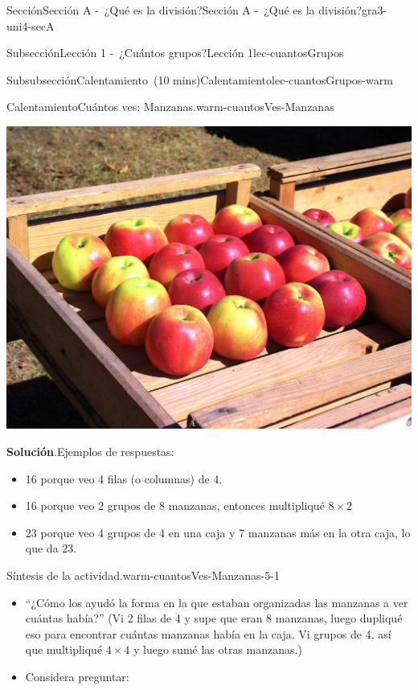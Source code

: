 \documentclass[oneside,10pt,]{article}
\newcommand{\blocktitlefont}{\relax}
\begin{document}
\begin{sectionptx}{Sección}{Sección A -~¿Qué es la división?}{}{Sección A -~¿Qué es la división?}{}{}{gra3-uni4-secA}
\begin{subsectionptx}{Subsección}{Lección 1 -~¿Cuántos grupos?}{}{Lección 1}{}{}{lec-cuantosGrupos}
\begin{subsubsectionptx}{Subsubsección}{Calentamiento~(10 mins)}{}{Calentamiento}{}{}{lec-cuantosGrupos-warm}
\begin{exploration}{Calentamiento}{Cuántos ves: Manzanas.}{warm-cuantosVes-Manzanas}
\begin{image}{0}{1}{0}{}
\includegraphics[width=\linewidth]{external/jpg-source/apples-1642732_1920.jpg}
\end{image}%
\par\smallskip%
\noindent\textbf{\blocktitlefont Solución}.\hypertarget{warm-cuantosVes-Manzanas-3}{}\quad{}Ejemplos de respuestas:%
%
\begin{itemize}[label=\textbullet]
\item{}16 porque veo 4 filas (o columnas) de 4.%
\item{}16 porque veo 2 grupos de 8 manzanas, entonces multipliqué \(8\times 2\)%
\item{}23 porque veo 4 grupos de 4 en una caja y 7 manzanas más en la otra caja, lo que da 23.%
\end{itemize}
\end{exploration}%
%
\par
\begin{paragraphs}{Síntesis de la actividad.}{warm-cuantosVes-Manzanas-5-1}%
%
\begin{itemize}[label=\textbullet]
\item{}``¿Cómo los ayudó la forma en la que estaban organizadas las manzanas a ver cuántas había?'' (Vi 2 filas de 4 y supe que eran 8 manzanas, luego dupliqué eso para encontrar cuántas manzanas había en la caja. Vi grupos de 4, así que multipliqué \(4\times 4\) y luego sumé las otras manzanas.)%
\item{}Considera preguntar:%
\begin{itemize}[label=$\circ$]

\end{itemize}
\end{itemize}
\end{paragraphs}
\end{subsubsectionptx}
\end{subsectionptx}
\end{sectionptx}
\end{document}
